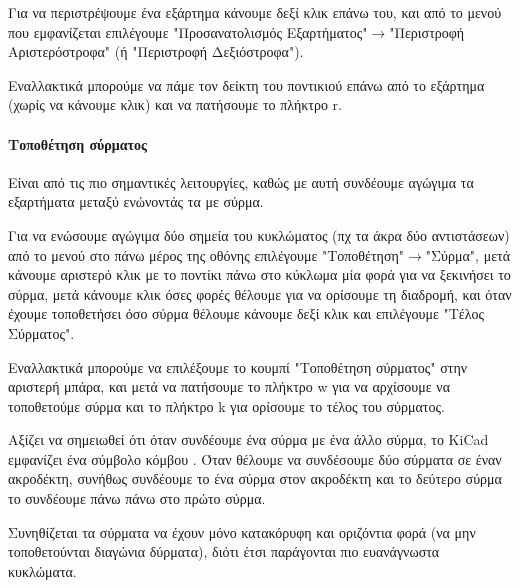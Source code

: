 \documentclass[a4paper]{article}
\begin{document}
Για να περιστρέψουμε ένα εξάρτημα κάνουμε δεξί κλικ επάνω του, και από το μενού που εμφανίζεται επιλέγουμε "Προσανατολισμός Εξαρτήματος"$\rightarrow$"Περιστροφή Αριστερόστροφα" (ή "Περιστροφή Δεξιόστροφα"). 

Εναλλακτικά μπορούμε να πάμε τον δείκτη του ποντικιού επάνω από το εξάρτημα (χωρίς να κάνουμε κλικ) και να πατήσουμε το πλήκτρο r.

\paragraph{Τοποθέτηση σύρματος}
Είναι από τις πιο σημαντικές λειτουργίες, καθώς με αυτή συνδέουμε αγώγιμα τα εξαρτήματα μεταξύ ενώνοντάς τα με σύρμα.

Για να ενώσουμε αγώγιμα δύο σημεία του κυκλώματος (πχ τα άκρα δύο αντιστάσεων) από το μενού στο πάνω μέρος της οθόνης επιλέγουμε "Τοποθέτηση"$\rightarrow$"Σύρμα", μετά κάνουμε αριστερό κλικ με το ποντίκι πάνω στο κύκλωμα μία φορά για να ξεκινήσει το σύρμα, μετά κάνουμε κλικ όσες φορές θέλουμε για να ορίσουμε τη διαδρομή, και όταν έχουμε τοποθετήσει όσο σύρμα θέλουμε κάνουμε δεξί κλικ και επιλέγουμε "Τέλος Σύρματος". 

Εναλλακτικά μπορούμε να επιλέξουμε το κουμπί "Τοποθέτηση σύρματος" %
στην αριστερή μπάρα, και μετά να πατήσουμε το πλήκτρο w για να αρχίσουμε να τοποθετούμε σύρμα και το πλήκτρο k για ορίσουμε το τέλος του σύρματος.

Αξίζει να σημειωθεί ότι όταν συνδέουμε ένα σύρμα με ένα άλλο σύρμα, το KiCad εμφανίζει ένα σύμβολο κόμβου %
. Όταν θέλουμε να συνδέσουμε δύο σύρματα σε έναν ακροδέκτη, συνήθως συνδέουμε το ένα σύρμα στον ακροδέκτη και το δεύτερο σύρμα το συνδέουμε πάνω πάνω στο πρώτο σύρμα.

Συνηθίζεται τα σύρματα να έχουν μόνο κατακόρυφη και οριζόντια φορά (να μην τοποθετούνται διαγώνια δύρματα), διότι έτσι παράγονται πιο ευανάγνωστα κυκλώματα.

\begin{figure}
  \begin{center}
    \label{fig:kicad-main}
  \end{center}
\end{figure}

\begin{figure}
  \begin{center}
    \label{fig:kicad-main}
  \end{center}
\end{figure}
   
\end{document}
